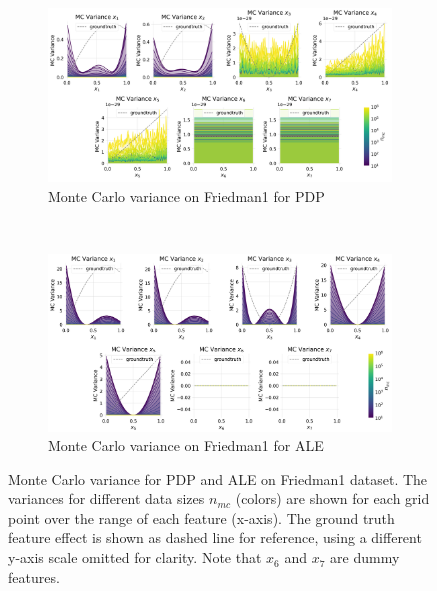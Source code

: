 \documentclass[runningheads]{llncs}
\begin{document}
\begin{figure}[h!]
    \centering
    \begin{subfigure}[b]{\textwidth}
        \centering
        \includegraphics[width=\textwidth]{img/Friedman1-all/mc_variance_pdp.png}
        \caption{Monte Carlo variance on Friedman1 for PDP}
    \end{subfigure}
    \\[10pt]
    \vfill
    \begin{subfigure}[b]{\textwidth}
        \centering
        \includegraphics[width=\textwidth]{img/Friedman1-all/mc_variance_ale.png}
        \caption{Monte Carlo variance on Friedman1 for ALE}
    \end{subfigure}
    \caption{Monte Carlo variance for PDP and ALE on Friedman1 dataset.
        The variances for different data sizes $n_{mc}$ (colors) are shown for each grid
        point over the range of each feature (x-axis). The ground truth feature effect is
        shown as dashed line for reference, using a different y-axis scale omitted for
        clarity. Note that $x_6$ and $x_7$ are dummy features.}
    \label{fig:mc-variance-friedman1}  %
\end{figure}
\end{document}
